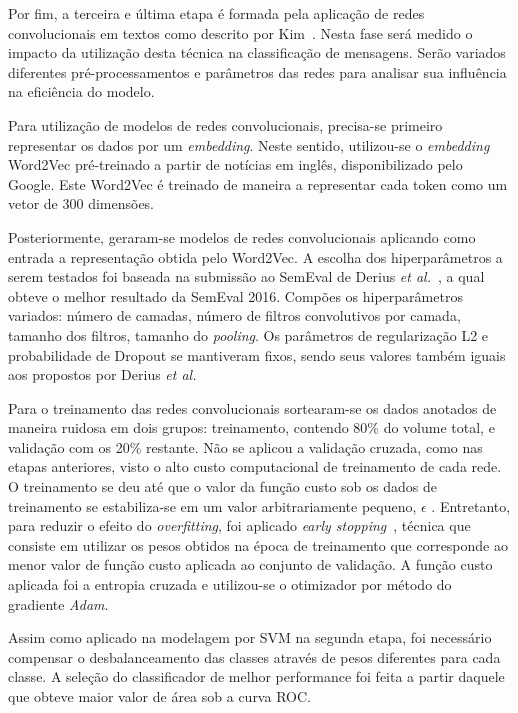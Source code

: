 Por fim, a terceira e última etapa é formada pela aplicação de redes convolucionais em textos como descrito por
Kim~\cite{kim14}.
Nesta fase será medido o impacto da utilização desta técnica na classificação de mensagens.
Serão variados diferentes pré-processamentos e parâmetros das redes para analisar sua influência na eficiência do
modelo.

Para utilização de modelos de redes convolucionais, precisa-se primeiro representar os dados por um \textit{embedding}.
Neste sentido, utilizou-se o \textit{embedding} Word2Vec pré-treinado a partir de notícias em inglês, disponibilizado
pelo Google.
Este Word2Vec é treinado de maneira a representar cada token como um vetor de 300 dimensões.

Posteriormente, geraram-se modelos de redes convolucionais aplicando como entrada a representação obtida pelo Word2Vec.
A escolha dos hiperparâmetros a serem testados foi baseada na submissão ao SemEval de Derius
\textit{et al.}~\cite{deriu16}, a qual obteve o melhor resultado da SemEval 2016.
Compões os hiperparâmetros variados: número de camadas, número de filtros convolutivos por camada, tamanho dos filtros,
tamanho do \textit{pooling}.
Os parâmetros de regularização L2 e probabilidade de Dropout se mantiveram fixos, sendo seus valores também iguais aos
propostos por Derius \textit{et al.}

Para o treinamento das redes convolucionais sortearam-se os dados anotados de maneira ruidosa em dois grupos:
treinamento, contendo 80\% do volume total, e validação com os 20\% restante.
Não se aplicou a validação cruzada, como nas etapas anteriores, visto o alto custo computacional de treinamento de cada
rede.
O treinamento se deu até que o valor da função custo sob os dados de treinamento se estabiliza-se em um valor
arbitrariamente pequeno, $\epsilon$ .
Entretanto, para reduzir o efeito do \textit{overfitting}, foi aplicado \textit{early stopping}~\cite{caruana01},
técnica que consiste em utilizar os pesos obtidos na época de treinamento que corresponde ao menor valor de função custo
aplicada ao conjunto de validação.
A função custo aplicada foi a entropia cruzada e utilizou-se o otimizador por método do gradiente \textit{Adam}.

Assim como aplicado na modelagem por SVM na segunda etapa, foi necessário compensar o desbalanceamento das classes
através de pesos diferentes para cada classe.
A seleção do classificador de melhor performance foi feita a partir daquele que obteve maior valor de área sob a curva
ROC.

